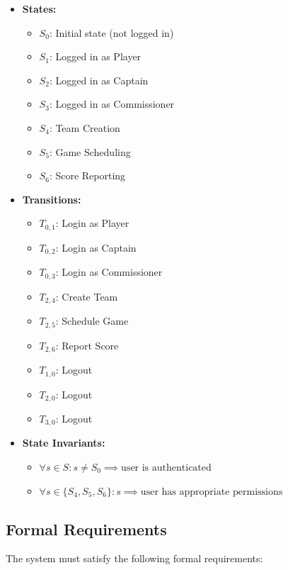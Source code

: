 \documentclass[12pt, titlepage]{article}
\begin{document}
\begin{itemize}
    \item \textbf{States:}
    \begin{itemize}
        \item $S_0$: Initial state (not logged in)
        \item $S_1$: Logged in as Player
        \item $S_2$: Logged in as Captain
        \item $S_3$: Logged in as Commissioner
        \item $S_4$: Team Creation
        \item $S_5$: Game Scheduling
        \item $S_6$: Score Reporting
    \end{itemize}

    \item \textbf{Transitions:}
    \begin{itemize}
        \item $T_{0,1}$: Login as Player
        \item $T_{0,2}$: Login as Captain
        \item $T_{0,3}$: Login as Commissioner
        \item $T_{2,4}$: Create Team
        \item $T_{2,5}$: Schedule Game
        \item $T_{2,6}$: Report Score
        \item $T_{1,0}$: Logout
        \item $T_{2,0}$: Logout
        \item $T_{3,0}$: Logout
    \end{itemize}

    \item \textbf{State Invariants:}
    \begin{itemize}
        \item $\forall s \in S: s \neq S_0 \implies \text{user is authenticated}$
        \item $\forall s \in \{S_4, S_5, S_6\}: s \implies \text{user has appropriate permissions}$
    \end{itemize}
\end{itemize}

\subsection{Formal Requirements}
The system must satisfy the following formal requirements:
\end{document}
